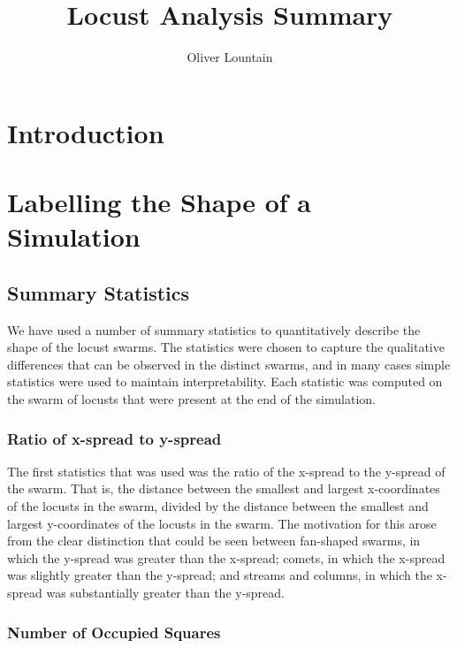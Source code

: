 \documentclass[a4paper]{article}
\begin{document}
\title{Locust Analysis Summary}
\author{Oliver Lountain}

\maketitle




\section{Introduction}



\section{Labelling the Shape of a Simulation}

\subsection{Summary Statistics}

We have used a number of summary statistics to quantitatively describe the shape of the locust swarms. The statistics were chosen to capture the qualitative differences that can be observed in the distinct swarms, and in many cases simple statistics were used to maintain interpretability. Each statistic was computed on the swarm of locusts that were present at the end of the simulation. 

\subsubsection{Ratio of x-spread to y-spread}

The first statistics that was used was the ratio of the x-spread to the y-spread of the swarm. That is, the distance between the smallest and largest x-coordinates of the locusts in the swarm, divided by the distance between the smallest and largest y-coordinates of the locusts in the swarm. The motivation for this arose from the clear distinction that could be seen between fan-shaped swarms, in which the y-spread was greater than the x-spread; comets, in which the x-spread was slightly greater than the y-spread; and streams and columns, in which the x-spread was substantially greater than the y-spread.

\subsubsection{Number of Occupied Squares}
\end{document}
